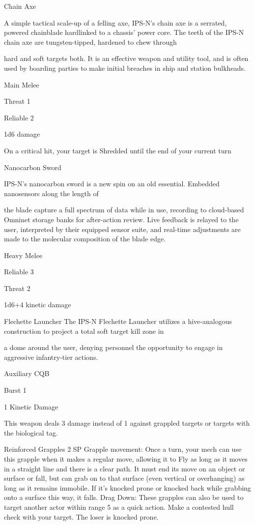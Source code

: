 Chain Axe  

A simple tactical scale-up of a felling axe, IPS-N’s chain axe is a serrated, powered chainblade hardlinked  
to a chassis’ power core. The teeth of the IPS-N chain axe are tungsten-tipped, hardened to chew through  

hard and soft targets both. It is an effective weapon and utility tool, and is often used by boarding parties to  
make initial breaches in ship and station bulkheads.   

Main Melee
 
Threat 1
 
Reliable 2
 
1d6 damage
 
On a critical hit, your target is Shredded until the end of your current turn
 

Nanocarbon Sword  

IPS-N’s nanocarbon sword is a new spin on an old essential. Embedded nanosensors along the length of  

the blade capture a full spectrum of data while in use, recording to cloud-based Omninet storage banks for  
after-action review. Live feedback is relayed to the user, interpreted by their equipped sensor suite, and  
real-time adjustments are made to the molecular composition of the blade edge.  

Heavy Melee
 

                                                                                                                      


Reliable 3
 
Threat 2
 
1d6+4 kinetic damage
 

Flechette Launcher  
The IPS-N Flechette Launcher utilizes a hive-analogous construction to project a total soft target kill zone in  

a dome around the user, denying personnel the opportunity to engage in aggressive infantry-tier actions.   

Auxiliary CQB
 
Burst 1
 
1 Kinetic Damage
 
This weapon deals 3 damage instead of 1 against grappled targets or targets with the biological  
tag.
 

Reinforced Grapples  
2 SP  
Grapple movement: Once a turn, your mech can use this grapple when it makes a regular move,  
allowing it to Fly as long as it moves in a straight line and there is a clear path. It must end its  
move on an object or surface or fall, but can grab on to that surface (even vertical or overhanging)  
as long as it remains immobile. If it’s knocked prone or knocked back while grabbing onto a  
surface this way, it falls.  
Drag Down: These grapples can also be used to target another actor within range 5 as a quick  
action. Make a contested hull check with your target. The loser is knocked prone.
 

